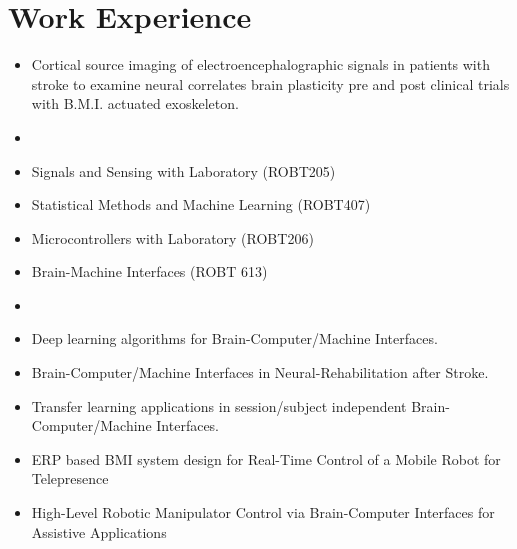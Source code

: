 \documentclass[10pt,letterpaper,sans]{moderncv}   %
\begin{document}
\section{Work Experience}
{{\begin{itemize}                         
            \item Cortical source imaging of electroencephalographic signals in patients with stroke to examine neural correlates brain plasticity pre and post clinical trials with B.M.I. actuated exoskeleton.
        \end{itemize}
}} 

{{\begin{itemize}%
\item[Teaching :] 
\item Signals and Sensing with Laboratory (ROBT205) 
\item Statistical Methods and Machine Learning (ROBT407)
\item Microcontrollers with Laboratory (ROBT206)
\item Brain-Machine Interfaces (ROBT 613)
\item[Research Focus:] 
\item Deep learning algorithms for Brain-Computer/Machine Interfaces. 
\item Brain-Computer/Machine Interfaces in Neural-Rehabilitation after Stroke. 
\item Transfer learning applications in session/subject independent Brain-Computer/Machine Interfaces. 
\item ERP based BMI system design for Real-Time Control of a Mobile Robot for Telepresence  
\item High-Level Robotic Manipulator Control via Brain-Computer Interfaces for Assistive Applications  
\end{itemize}
}}
 
\end{document}
